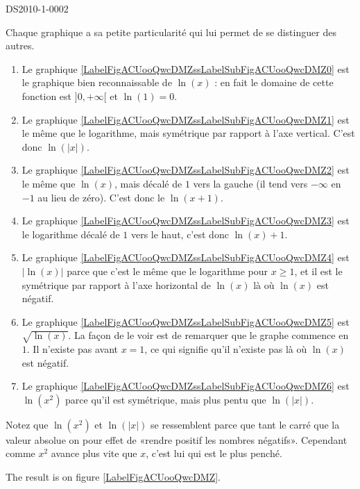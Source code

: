 
\begin{corrige}{DS2010-1-0002}

	Chaque graphique a sa petite particularité qui lui permet de se distinguer des autres.
	\begin{enumerate}
		\item
			Le graphique \ref{LabelFigACUooQwcDMZssLabelSubFigACUooQwcDMZ0} est le graphique bien reconnaissable de $\ln(x)$ : en fait le domaine de cette fonction est $]0, +\infty[$ et $\ln (1)=0$.
		\item
			Le graphique \ref{LabelFigACUooQwcDMZssLabelSubFigACUooQwcDMZ1} est le même que le logarithme, mais symétrique par rapport à l'axe vertical. C'est donc $\ln(| x |)$.
		\item
			Le graphique \ref{LabelFigACUooQwcDMZssLabelSubFigACUooQwcDMZ2} est le même que $\ln(x)$, mais décalé de $1$ vers la gauche (il tend vers $-\infty$ en $-1$ au lieu de zéro). C'est donc le $\ln(x+1)$.
		\item
			Le graphique \ref{LabelFigACUooQwcDMZssLabelSubFigACUooQwcDMZ3} est le logarithme décalé de $1$ vers le haut, c'est donc $\ln(x)+1$.
		\item
			Le graphique \ref{LabelFigACUooQwcDMZssLabelSubFigACUooQwcDMZ4} est $| \ln(x) |$ parce que c'est le même que le logarithme pour $x\geq 1$, et il est le symétrique par rapport à l'axe horizontal de $\ln(x)$ là où $\ln(x)$ est négatif.
		\item
			Le graphique \ref{LabelFigACUooQwcDMZssLabelSubFigACUooQwcDMZ5} est $\sqrt{\ln(x)}$. La façon de le voir est de remarquer que le graphe commence en $1$. Il n'existe pas avant $x=1$, ce qui signifie qu'il n'existe pas là où $\ln(x)$ est négatif.
		\item
			Le graphique \ref{LabelFigACUooQwcDMZssLabelSubFigACUooQwcDMZ6} est $\ln(x^2)$ parce qu'il est symétrique, mais plus pentu que $\ln(| x |)$.
			
	\end{enumerate}
	Notez que $\ln(x^2)$ et $\ln(| x |)$ se ressemblent parce que tant le carré que la valeur absolue on pour effet de «rendre positif les nombres négatifs». Cependant comme $x^2$ avance plus vite que $x$, c'est lui qui est le plus penché.

\end{corrige}


The result is on figure \ref{LabelFigACUooQwcDMZ}. %
\newcommand{\CaptionFigACUooQwcDMZ}{<+Type your caption here+>}

